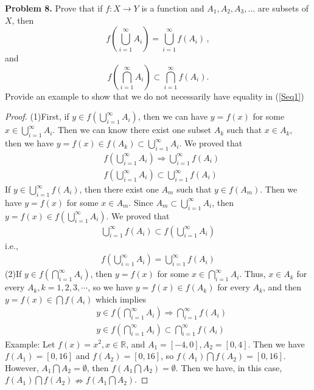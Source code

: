\documentclass[12pt,leqno]{amsart}
\begin{document}
\noindent
{\bf Problem 8.}
{ Prove that if $f:X\to Y$ is a function and $A_1,A_2,A_3,\ldots$ are subsets of $X$, then
$$
f\left(\bigcup_{i=1}^\infty A_i\right) =
\bigcup_{i=1}^\infty f(A_i)\, ,
$$
and
\begin{equation}
\label{Seq1}
f\left( \bigcap_{i=1}^\infty A_i\right) \subset
\bigcap_{i=1}^\infty f(A_i).
\end{equation}
Provide an example to show that we do not necessarily have equality in (\ref{Seq1})}
\begin{proof}
(1)First, if $y\in f\left(\bigcup_{i=1}^\infty A_i\right)$, then we can have $y = f(x)$ for some $x \in \bigcup_{i=1}^\infty A_i$. Then we can know there exist one subset $A_k$ such that $x \in A_k$, then we have $y = f(x) \in f(A_k) \subset \bigcup_{i=1}^\infty A_i$. We proved that
\begin{align*}
    & f\left(\bigcup_{i=1}^\infty A_i\right) \Rightarrow \bigcup_{i=1}^\infty f(A_i) \\
    & f\left(\bigcup_{i=1}^\infty A_i\right) \subset \bigcup_{i=1}^\infty f(A_i)
\end{align*}
If $y \in \bigcup_{i=1}^\infty f(A_i)$, then there exist one $A_m$ such that $y \in f(A_m)$. Then we have $y = f(x)$ for some $x \in A_m$. Since $A_m \subset \bigcup_{i=1}^\infty A_i$, then $y = f(x) \in f\left(\bigcup_{i=1}^\infty A_i\right)$. We proved that
\begin{align*}
    \bigcup_{i=1}^\infty f(A_i) \subset f\left(\bigcup_{i=1}^\infty A_i\right) 
\end{align*}
i.e.,
\begin{align*}
    f\left(\bigcup_{i=1}^\infty A_i\right) = \bigcup_{i=1}^\infty f(A_i)
\end{align*}
\hspace*{2em}(2)If $y \in f\left( \bigcap_{i=1}^\infty A_i\right)$, then $y = f(x)$ for some $x \in \bigcap_{i=1}^\infty A_i$. Thus, $x \in A_k$ for every $A_k, k = 1,2,3,\cdots$, so we have $y = f(x) \in f(A_k)$ for every $A_k$, and then $y = f(x) \in \bigcap f(A_i)$ which implies 
\begin{align*}
    & y \in f\left( \bigcap_{i=1}^\infty A_i\right) \Rightarrow \bigcap_{i=1}^\infty f(A_i) \\
    & y \in f\left( \bigcap_{i=1}^\infty A_i\right) \subset \bigcap_{i=1}^\infty f(A_i)
\end{align*}
Example: Let $f(x) = x^2, x\in \mathbb{R}$, and $A_1 = [-4,0], A_2 = [0,4]$. Then we have $f(A_1) = [0, 16]$ and $f(A_2) = [0, 16]$, so $f(A_1) \bigcap f(A_2)  = [0, 16]$. However, $A_1 \bigcap A_2 = \emptyset$, then $f(A_1 \bigcap A_2) = \emptyset$. Then we have, in this case, $f(A_1) \bigcap f(A_2) \nRightarrow f(A_1 \bigcap A_2)$.

\end{proof}
\end{document}
